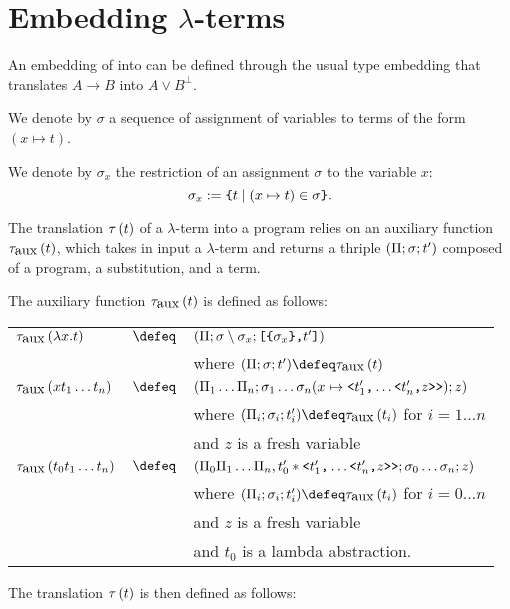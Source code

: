 \documentclass{article}
\begin{document}
\section{Embedding $\lambda$-terms}

An embedding of \lats{} into \claps{} can be defined through the
usual type embedding that translates $A \to B$ into $A \vee B^\bot$.

We denote by $\sigma$ a sequence of assignment of variables to terms
of the form $(x \mapsto t)$.

We denote by $\sigma_x$ the restriction of an assignment $\sigma$
to the variable $x$:
\[\sigma_x := \mbox{\normalfont\texttt{\{}}t \mid (x \mapsto t) \in \sigma\mbox{\normalfont\texttt{\}}}.\]

The translation $\tau\left(t\right)$ of a $\lambda$-term into a program relies on an auxiliary function $\tau_{\mbox{aux}}\left(t\right)$, which takes
in input a $\lambda$-term and returns a thriple $(\Pi; \sigma; t')$ composed of a program, a substitution, and a term.

The auxiliary function $\tau_{\mbox{aux}}\left(t\right)$ is defined as follows:

\begin{center}
\bgroup
\def\arraystretch{1.3}
\begin{tabular}{lcl}
    $\tau_{\mbox{aux}}\left(\lambda x. t\right) $ & $\defeq$ & $(\Pi; \sigma \setminus \sigma_x; \mbox{\normalfont\texttt{[}}\mbox{\normalfont\texttt{\{}}\sigma_x\mbox{\normalfont\texttt{\}}} \mbox{\normalfont\texttt{,}} t'\mbox{\normalfont\texttt{]}}) $ \\
    & & where $(\cuts; \sigma; t') \defeq \ltransaux{t}$ \\
    $\tau_{\mbox{aux}}\left(x t_1 \ldots t_n\right)$ & $\defeq$ & $(\Pi_1\ldots\Pi_n; \sigma_1\ldots \sigma_n(x\mapsto\mbox{\normalfont\texttt{<}} t_1' \mbox{\normalfont\texttt{,}} \ldots\mbox{\normalfont\texttt{<}} t_n' \mbox{\normalfont\texttt{,}} z\mbox{\normalfont\texttt{>}}\mbox{\normalfont\texttt{>}}); z) $ \\
    & & where $(\cuts_i; \sigma_i; t_i') \defeq \ltransaux{t_i}$ for $i=1\ldots n$\\
    & & and $z$ is a fresh variable \\
    $\tau_{\mbox{aux}}\left(t_0 t_1 \ldots t_n\right)$ & $\defeq$ & $(\Pi_0\Pi_1\ldots\Pi_n, t_0' * \mbox{\normalfont\texttt{<}} t_1' \mbox{\normalfont\texttt{,}} \ldots\mbox{\normalfont\texttt{<}} t_n' \mbox{\normalfont\texttt{,}} z\mbox{\normalfont\texttt{>}}\mbox{\normalfont\texttt{>}}; \sigma_0\ldots \sigma_n; z)$ \\
    & & where $(\cuts_i; \sigma_i; t_i') \defeq \ltransaux{t_i}$ for $i=0\ldots n$ \\
    & & and $z$ is a fresh variable \\
    & & and $t_0$ is a lambda abstraction. \\
\end{tabular}
\egroup
\end{center}

The translation $\tau\left(t\right)$ is then defined as follows:
\end{document}
